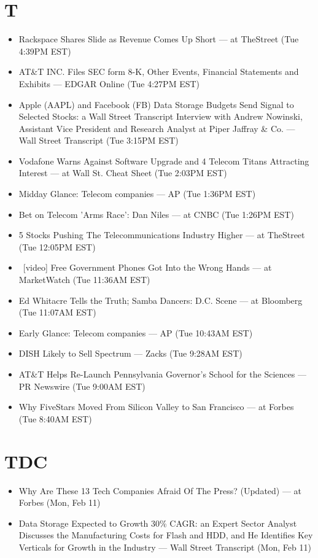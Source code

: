 \documentclass[11pt,asymmetric]{article}
\begin{document}
\section*{T}
\begin{itemize}
\item Rackspace Shares Slide as Revenue Comes Up Short --- at TheStreet (Tue 4:39PM EST)
\item AT\&T INC. Files SEC form 8-K, Other Events, Financial Statements and Exhibits --- EDGAR Online (Tue 4:27PM EST)
\item Apple (AAPL) and Facebook (FB) Data Storage Budgets Send Signal to Selected Stocks: a Wall Street Transcript Interview with Andrew Nowinski, Assistant Vice President and Research Analyst at Piper Jaffray \& Co. --- Wall Street Transcript (Tue 3:15PM EST)
\item Vodafone Warns Against Software Upgrade and 4 Telecom Titans Attracting Interest --- at Wall St. Cheat Sheet (Tue 2:03PM EST)
\item Midday Glance: Telecom companies --- AP (Tue 1:36PM EST)
\item Bet on Telecom 'Arms Race': Dan Niles --- at CNBC (Tue 1:26PM EST)
\item 5 Stocks Pushing The Telecommunications Industry Higher --- at TheStreet (Tue 12:05PM EST)
\item\ [video] Free Government Phones Got Into the Wrong Hands --- at MarketWatch (Tue 11:36AM EST)
\item Ed Whitacre Tells the Truth; Samba Dancers: D.C. Scene --- at Bloomberg (Tue 11:07AM EST)
\item Early Glance: Telecom companies --- AP (Tue 10:43AM EST)
\item DISH Likely to Sell Spectrum --- Zacks (Tue 9:28AM EST)
\item AT\&T Helps Re-Launch Pennsylvania Governor's School for the Sciences --- PR Newswire (Tue 9:00AM EST)
\item Why FiveStars Moved From Silicon Valley to San Francisco --- at Forbes (Tue 8:40AM EST)
\end{itemize}

\section*{TDC}
\begin{itemize}
\item Why Are These 13 Tech Companies Afraid Of The Press? (Updated) --- at Forbes (Mon, Feb 11)
\item Data Storage Expected to Growth 30\% CAGR: an Expert Sector Analyst Discusses the Manufacturing Costs for Flash and HDD, and He Identifies Key Verticals for Growth in the Industry --- Wall Street Transcript (Mon, Feb 11)
\end{itemize}
\end{document}
